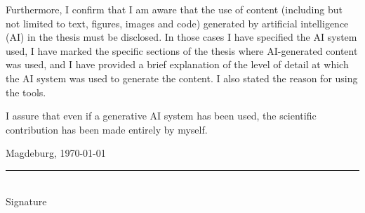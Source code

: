 \documentclass[
	12pt,
	a4paper,
	abstract,
	bibliography=totoc,
	chapterprefix,
	headings=openright,
	numbers=endperiod,
	parskip=half,
	twoside,
]{scrreprt}
\begin{document}
Furthermore, I confirm that I am aware that the use of content (including but not limited to text, figures, images and code) generated by artificial intelligence (AI) in the thesis must be disclosed.
In those cases I have specified the AI system used, I have marked the specific sections of the thesis where AI-generated content was used, and I have provided a brief explanation of the level of detail at which the AI system was used to generate the content.
I also stated the reason for using the tools.

I assure that even if a generative AI system has been used, the scientific contribution has been made entirely by myself.

\bigskip

Magdeburg, \today

\bigskip
\bigskip

\rule{0.5\textwidth}{0.5pt}\\
\hspace*{0.25em}Signature
\end{document}
